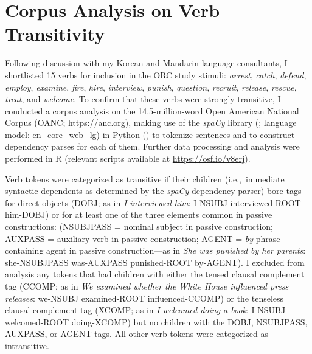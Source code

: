 
\chapter{Corpus Analysis on Verb Transitivity}\label{app-transitivity}

\setlength{\parindent}{2.6em}

Following discussion with my Korean and Mandarin language consultants, I shortlisted 15 verbs for inclusion in the ORC study stimuli: \textit{arrest}, \textit{catch}, \textit{defend}, \textit{employ}, \textit{examine}, \textit{fire}, \textit{hire}, \textit{interview}, \textit{punish}, \textit{question}, \textit{recruit}, \textit{release}, \textit{rescue}, \textit{treat}, and \textit{welcome}. To confirm that these verbs were strongly transitive, I conducted a corpus analysis on the 14.5-million-word Open American National Corpus (OANC; \url{https://anc.org}), making use of the \textit{spaCy} library (\cite{honnibal.montani2017}; language model: en\_core\_web\_lg) in Python (\cite{pythonsoftwarefoundation2021}) to tokenize sentences and to construct dependency parses for each of them. Further data processing and analysis were performed in R (relevant scripts available at \url{https://osf.io/v8erj}).

Verb tokens were categorized as transitive if their children (i.e.,~immediate syntactic dependents as determined by the \textit{spaCy} dependency parser) bore tags for direct objects (DOBJ; as in \textit{I interviewed him}: I-NSUBJ interviewed-ROOT him-DOBJ) or for at least one of the three elements common in passive constructions: (NSUBJPASS = nominal subject in passive construction; AUXPASS = auxiliary verb in passive construction; AGENT = \textit{by}-phrase containing agent in passive construction---as in \textit{She was punished by her parents}: she-NSUBJPASS was-AUXPASS punished-ROOT by-AGENT). I excluded from analysis any tokens that had children with either the tensed clausal complement tag (CCOMP; as in \textit{We examined whether the White House influenced press releases}: we-NSUBJ examined-ROOT influenced-CCOMP) or the tenseless clausal complement tag (XCOMP; as in \textit{I welcomed doing a book}: I-NSUBJ welcomed-ROOT doing-XCOMP) but no children with the DOBJ, NSUBJPASS, AUXPASS, or AGENT tags. All other verb tokens were categorized as intransitive.

